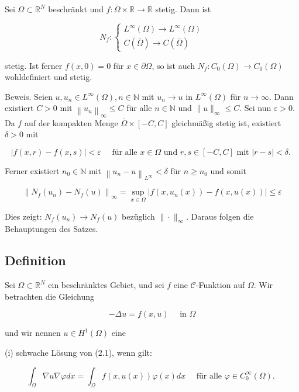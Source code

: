 \documentclass[10pt, letterpaper]{article}
\begin{document}
Sei $\Omega \subset \mathbb{R}^{N}$ beschränkt und $f: \bar{\Omega} \times \mathbb{R} \rightarrow \mathbb{R}$ stetig. Dann ist

$$
N_{f}:\left\{\begin{array}{l}
L^{\infty}(\Omega) \rightarrow L^{\infty}(\Omega) \\
C(\bar{\Omega}) \rightarrow C(\bar{\Omega})
\end{array}\right.
$$

stetig. Ist ferner $f(x, 0)=0$ für $x \in \partial \Omega$, so ist auch $N_{f}: C_{0}(\Omega) \rightarrow C_{0}(\Omega)$ wohldefiniert und stetig.

Beweis. Seien $u, u_{n} \in L^{\infty}(\Omega), n \in \mathbb{N}$ mit $u_{n} \rightarrow u$ in $L^{\infty}(\Omega)$ für $n \rightarrow \infty$. Dann existiert $C>0$ mit $\left\|u_{n}\right\|_{\infty} \leq C$ für alle $n \in \mathbb{N}$ und $\|u\|_{\infty} \leq C$. Sei nun $\varepsilon>0$. Da $f$ auf der kompakten Menge $\bar{\Omega} \times[-C, C]$ gleichmäßig stetig ist, existiert $\delta>0$ mit

$$
|f(x, r)-f(x, s)|<\varepsilon \quad \text { für alle } x \in \Omega \text { und } r, s \in[-C, C] \text { mit }|r-s|<\delta \text {. }
$$

Ferner existiert $n_{0} \in \mathbb{N}$ mit $\left\|u_{n}-u\right\|_{L^{\infty}}<\delta$ für $n \geq n_{0}$ und somit

$$
\left\|N_{f}\left(u_{n}\right)-N_{f}(u)\right\|_{\infty}=\sup _{x \in \Omega}\left|f\left(x, u_{n}(x)\right)-f(x, u(x))\right| \leq \varepsilon
$$

Dies zeigt: $N_{f}\left(u_{n}\right) \rightarrow N_{f}(u)$ bezüglich $\|\cdot\|_{\infty}$. Daraus folgen die Behauptungen des Satzes.

\subsection*{Definition}

Sei $\Omega \subset \mathbb{R}^{N}$ ein beschränktes Gebiet, und sei $f$ eine $\mathcal{C}$-Funktion auf $\Omega$. Wir betrachten die Gleichung

$$
-\Delta u=f(x, u) \quad \text { in } \Omega
$$

und wir nennen $u \in H^{1}(\Omega)$ eine

(i) schwache Lösung von (2.1), wenn gilt:

$$
\int_{\Omega} \nabla u \nabla \varphi d x=\int_{\Omega} f(x, u(x)) \varphi(x) d x \quad \text { für alle } \varphi \in C_{0}^{\infty}(\Omega) \text {. }
$$
\end{document}
